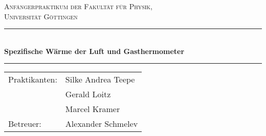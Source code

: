 \begin{titlepage}
\centering
\textsc{\Large Anfängerpraktikum der Fakultät für
  Physik,\\[1.5ex] Universität Göttingen}

\vspace*{4.2cm}

\rule{\textwidth}{1pt}\\[0.5cm]
{\huge \bfseries
  Spezifische Wärme der Luft und Gasthermometer}\\[0.5cm]
\rule{\textwidth}{1pt}

\vspace*{3.5cm}

\begin{Large}
\begin{tabular}{ll}
Praktikanten: &  Silke Andrea Teepe\\
& Gerald Loitz \\
& Marcel Kramer\\
Betreuer: & Alexander Schmelev\\
\end{tabular}
\end{Large}

\vspace*{0.8cm}

\begin{Large}
\end{Large}

\end{titlepage}